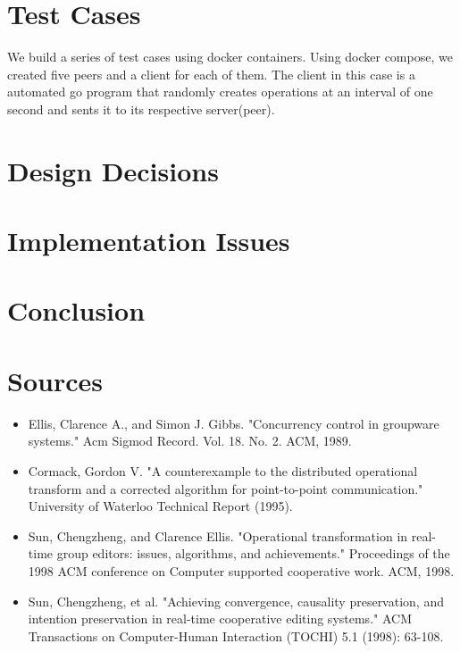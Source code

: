 \documentclass{article}
\begin{document}
\section{Test Cases}
We build a series of test cases using docker containers. Using docker compose, we created five peers and a client for each of them. The client in this case is a automated go program that randomly creates operations at an interval of one second and sents it to its respective server(peer).

\section{Design Decisions}

\section{Implementation Issues}

\section{Conclusion}

\section{Sources}
\begin{itemize}
	\item Ellis, Clarence A., and Simon J. Gibbs. "Concurrency control in groupware systems." Acm Sigmod Record. Vol. 18. No. 2. ACM, 1989.
	\item Cormack, Gordon V. "A counterexample to the distributed operational transform and a corrected algorithm for point-to-point communication." University of Waterloo Technical Report (1995).
	\item Sun, Chengzheng, and Clarence Ellis. "Operational transformation in real-time group editors: issues, algorithms, and achievements." Proceedings of the 1998 ACM conference on Computer supported cooperative work. ACM, 1998.
	\item Sun, Chengzheng, et al. "Achieving convergence, causality preservation, and intention preservation in real-time cooperative editing systems." ACM Transactions on Computer-Human Interaction (TOCHI) 5.1 (1998): 63-108.
\end{itemize}
\end{document}
